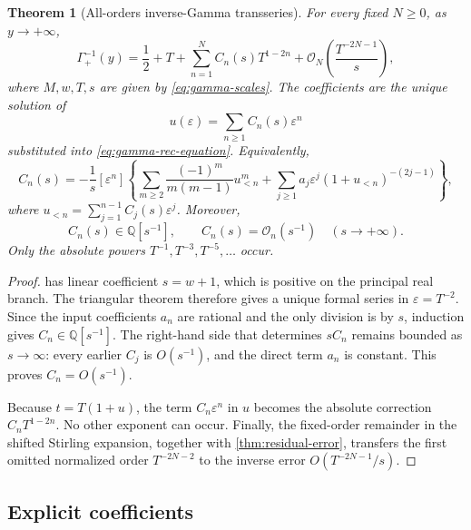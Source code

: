 \documentclass[11pt]{article}
\newtheorem{theorem}{Theorem}[section]
\theoremstyle{definition}
\theoremstyle{remark}
\newcommand{\BigO}{\mathcal O}
\newcommand{\Q}{\mathbb Q}
\newcommand{\Gaminv}{\Gamma_{+}^{-1}}
\begin{document}
\begin{theorem}[All-orders inverse-Gamma transseries]\label{thm:gamma-all-orders}
For every fixed \(N\ge0\), as \(y\to+\infty\),
\begin{equation}\label{eq:gamma-all-orders}
 \Gaminv(y)=\frac12+T+
 \sum_{n=1}^{N}C_n(s)T^{1-2n}
 +\mathcal O_N\!\left(\frac{T^{-2N-1}}{s}\right),
\end{equation}
where \(M,w,T,s\) are given by \cref{eq:gamma-scales}.  The coefficients are the unique solution of
\begin{equation}\label{eq:gamma-C-recurrence}
 u(\varepsilon)=\sum_{n\ge1}C_n(s)\varepsilon^n
\end{equation}
substituted into \cref{eq:gamma-rec-equation}.  Equivalently,
\begin{equation}\label{eq:gamma-C-triangular}
 C_n(s)=-\frac1s[\varepsilon^n]
 \left\{
 \sum_{m\ge2}\frac{(-1)^m}{m(m-1)}u_{<n}^{m}
 +\sum_{j\ge1}a_j\varepsilon^j(1+u_{<n})^{-(2j-1)}
 \right\},
\end{equation}
where \(u_{<n}=\sum_{j=1}^{n-1}C_j(s)\varepsilon^j\).  Moreover,
\begin{equation}\label{eq:gamma-C-ring}
 C_n(s)\in\Q[s^{-1}],\qquad C_n(s)=\BigO_n(s^{-1})
 \quad(s\to+\infty).
\end{equation}
Only the absolute powers \(T^{-1},T^{-3},T^{-5},\ldots\) occur.
\end{theorem}

\begin{proof}
 has linear coefficient \(s=w+1\), which is positive on the principal real branch.  The triangular theorem therefore gives a unique formal series in \(\varepsilon=T^{-2}\).  Since the input coefficients \(a_n\) are rational and the only division is by \(s\), induction gives \(C_n\in\Q[s^{-1}]\).  The right-hand side that determines \(sC_n\) remains bounded as \(s\to\infty\): every earlier \(C_j\) is \(O(s^{-1})\), and the direct term \(a_n\) is constant.  This proves \(C_n=O(s^{-1})\).

Because \(t=T(1+u)\), the term \(C_n\varepsilon^n\) in \(u\) becomes the absolute correction \(C_nT^{1-2n}\).  No other exponent can occur.  Finally, the fixed-order remainder in the shifted Stirling expansion, together with \cref{thm:residual-error}, transfers the first omitted normalized order \(T^{-2N-2}\) to the inverse error \(O(T^{-2N-1}/s)\).
\end{proof}

\subsection{Explicit coefficients}
\end{document}
